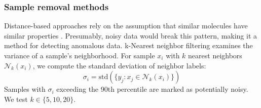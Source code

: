 \subsubsection{Sample removal methods}

Distance-based approaches rely on the assumption that similar molecules have similar properties \citep{Cherkasov2014}. Presumably, noisy data would break this pattern, making it a method for detecting anomalous data. k-Nearest neighbor filtering examines the variance of a sample's neighborhood. For sample $x_i$ with $k$ nearest neighbors $\mathcal{N}_k(x_i)$, we compute the standard deviation of neighbor labels:
$$
\sigma_i = \text{std}(\{y_j : x_j \in \mathcal{N}_k(x_i)\})
$$
Samples with $\sigma_i$ exceeding the 90th percentile are marked as potentially noisy. We test $k \in \{5, 10, 20\}$.

